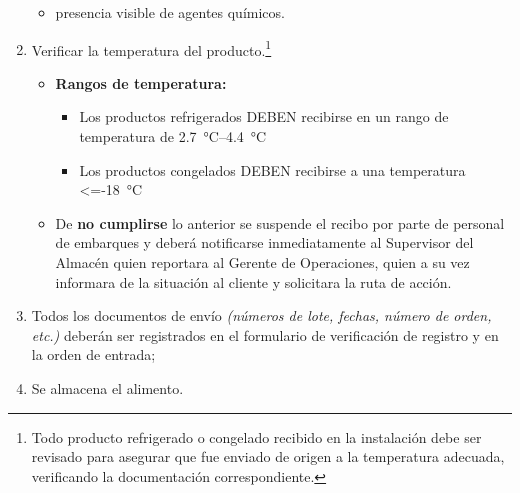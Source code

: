 \begin{enumerate}
\begin{itemize}
		      \item presencia visible de agentes químicos.
	      \end{itemize}
	\item Verificar la temperatura del producto.\footnote{Todo producto refrigerado o congelado recibido en la instalación debe ser revisado para asegurar que fue enviado de origen a la temperatura adecuada, verificando la documentación correspondiente.}
	      \begin{itemize}
		      \item \textbf{Rangos de temperatura:}
		            \begin{itemize}
			            \item Los productos refrigerados DEBEN recibirse en un rango de temperatura de \qtyrange{2.7}{4.4}{\degreeCelsius}
			            \item Los productos congelados DEBEN recibirse a una temperatura \qty{<=-18}{\degreeCelsius}
		            \end{itemize}
		      \item De \textbf{no cumplirse} lo anterior se suspende el recibo por parte de personal de embarques y deberá notificarse inmediatamente al Supervisor del Almacén quien reportara al Gerente de Operaciones, quien a su vez informara de la situación al cliente y solicitara la ruta de acción.
	      \end{itemize}
	\item Todos los documentos de envío \emph{(números de lote, fechas, número de orden, etc.)} deberán ser registrados en el formulario de verificación de \gls{registro} y en la orden de entrada;
	\item Se almacena el \gls{alimento}.
\end{enumerate}

